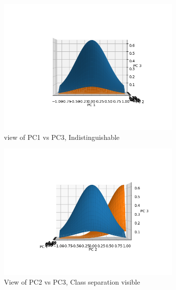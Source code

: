 \documentclass[11pt,letterpaper]{article}
\begin{document}
\begin{enumerate}[labelindent=0pt]
\begin{figure}[h!]
    \centering
    \begin{subfigure}[]{.3\textwidth}
        \includegraphics[width=\textwidth]{pc1.png}
        \caption{view of PC1 vs PC3, Indistinguishable}
        \label{fig:}
    \end{subfigure}
   \begin{subfigure}[]{.3\textwidth}
        \includegraphics[width=\textwidth]{pc3.png}
        \caption{View of PC2 vs PC3, Class separation visible}
        \label{fig:}
    \end{subfigure}
  \begin{subfigure}[]{.3\textwidth}

\end{subfigure}
\end{figure}
\end{enumerate}
\end{document}
